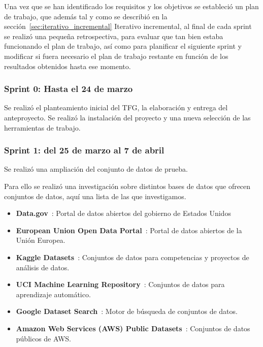 Una vez que se han identificado los requisitos y los objetivos se estableció un plan de trabajo, que además tal y como
se describió en la sección~\ref{sec:iterativo_incremental} Iterativo incremental, al final de cada sprint se realizó
una pequeña retrospectiva, para evaluar que tan bien estaba funcionando el plan de trabajo, así como para planificar
el siguiente sprint y modificar si fuera necesario el plan de trabajo restante en función de los resultados obtenidos
hasta ese momento.

\subsubsection{Sprint 0: Hasta el 24 de marzo}

Se realizó el planteamiento inicial del TFG, la elaboración y entrega del anteproyecto.
Se realizó la instalación del proyecto y una nueva selección de las herramientas de trabajo.

\subsubsection{Sprint 1: del 25 de marzo al 7 de abril}

Se realizó una ampliación del conjunto de datos de prueba.

Para ello se realizó una investigación sobre distintos bases de datos que ofrecen conjuntos de datos, aquí una lista
de las que investigamos.

\begin{itemize}
    \item \textbf{Data.gov}~\cite{https://www.data.gov/}: Portal de datos abiertos del gobierno de Estados Unidos
    \item \textbf{European Union Open Data Portal}~\cite{https://data.europa.eu/euodp/en/home}: Portal de datos abiertos
    de la Unión Europea.
    \item \textbf{Kaggle Datasets}~\cite{https://www.kaggle.com/datasets}: Conjuntos de datos para competencias y
    proyectos de análisis de datos.
    \item \textbf{UCI Machine Learning Repository}~\cite{https://archive.ics.uci.edu/ml/index.php}: Conjuntos de datos
    para aprendizaje automático.
    \item \textbf{Google Dataset Search}~\cite{https://datasetsearch.research.google.com/}: Motor de búsqueda de
    conjuntos de datos.
    \item \textbf{Amazon Web Services (AWS) Public Datasets}~\cite{https://registry.opendata.aws/}: Conjuntos de datos
    públicos de AWS.
\end{itemize}

